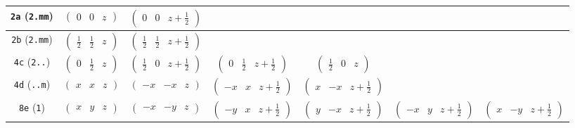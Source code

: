 \documentclass[fleqn,9pt,landscape]{jsarticle}
\begin{document}
\begin{center}
\begin{longtable}{ccccccc}
{\tt 2a} ({\tt 2.mm}) & $ \begin{pmatrix} 0 & 0 & z \end{pmatrix} $ & $ \begin{pmatrix} 0 & 0 & z + \frac{1}{2} \end{pmatrix} $ & $  $ & $  $ & $  $ & $  $ \\ \hline
{\tt 2b} ({\tt 2.mm}) & $ \begin{pmatrix} \frac{1}{2} & \frac{1}{2} & z \end{pmatrix} $ & $ \begin{pmatrix} \frac{1}{2} & \frac{1}{2} & z + \frac{1}{2} \end{pmatrix} $ & $  $ & $  $ & $  $ & $  $ \\ \hline
{\tt 4c} ({\tt 2..}) & $ \begin{pmatrix} 0 & \frac{1}{2} & z \end{pmatrix} $ & $ \begin{pmatrix} \frac{1}{2} & 0 & z + \frac{1}{2} \end{pmatrix} $ & $ \begin{pmatrix} 0 & \frac{1}{2} & z + \frac{1}{2} \end{pmatrix} $ & $ \begin{pmatrix} \frac{1}{2} & 0 & z \end{pmatrix} $ & $  $ & $  $ \\ \hline
{\tt 4d} ({\tt ..m}) & $ \begin{pmatrix} x & x & z \end{pmatrix} $ & $ \begin{pmatrix} - x & - x & z \end{pmatrix} $ & $ \begin{pmatrix} - x & x & z + \frac{1}{2} \end{pmatrix} $ & $ \begin{pmatrix} x & - x & z + \frac{1}{2} \end{pmatrix} $ & $  $ & $  $ \\ \hline
{\tt 8e} ({\tt 1}) & $ \begin{pmatrix} x & y & z \end{pmatrix} $ & $ \begin{pmatrix} - x & - y & z \end{pmatrix} $ & $ \begin{pmatrix} - y & x & z + \frac{1}{2} \end{pmatrix} $ & $ \begin{pmatrix} y & - x & z + \frac{1}{2} \end{pmatrix} $ & $ \begin{pmatrix} - x & y & z + \frac{1}{2} \end{pmatrix} $ & $ \begin{pmatrix} x & - y & z + \frac{1}{2} \end{pmatrix} $ \\

\end{longtable}
\end{center}
\end{document}
